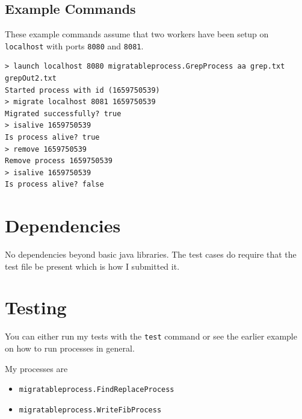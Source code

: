 \documentclass[12pt]{article}
\begin{document}
\subsection{Example Commands}
These example commands assume that two workers have been setup on \texttt{localhost} with ports \texttt{8080} and \texttt{8081}. 

\begin{verbatim}
> launch localhost 8080 migratableprocess.GrepProcess aa grep.txt grepOut2.txt
Started process with id (1659750539)
> migrate localhost 8081 1659750539
Migrated successfully? true
> isalive 1659750539
Is process alive? true
> remove 1659750539
Remove process 1659750539
> isalive 1659750539
Is process alive? false
\end{verbatim}


\section{Dependencies}

No dependencies beyond basic java libraries. The test cases do require that the test file be present which is how I submitted it.


\section{Testing}

You can either run my tests with the \texttt{test} command or see the earlier example on how to run processes in general. 

My processes are
\begin{itemize}
\item \texttt{migratableprocess.FindReplaceProcess} 
\item \texttt{migratableprocess.WriteFibProcess}
\end{itemize}
\end{document}

